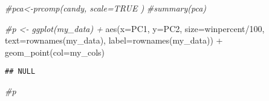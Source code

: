 \documentclass[
]{article}
\newenvironment{Shaded}{\begin{snugshade}}{\end{snugshade}}
\newcommand{\AttributeTok}[1]{\textcolor[rgb]{0.77,0.63,0.00}{#1}}
\newcommand{\CommentTok}[1]{\textcolor[rgb]{0.56,0.35,0.01}{\textit{#1}}}
\newcommand{\DecValTok}[1]{\textcolor[rgb]{0.00,0.00,0.81}{#1}}
\newcommand{\FunctionTok}[1]{\textcolor[rgb]{0.00,0.00,0.00}{#1}}
\newcommand{\NormalTok}[1]{#1}
\newcommand{\SpecialCharTok}[1]{\textcolor[rgb]{0.00,0.00,0.00}{#1}}
\begin{document}
\begin{Shaded}
\begin{Highlighting}[]
\CommentTok{\#pca\textless{}{-}prcomp(candy, scale=TRUE )}
\CommentTok{\#summary(pca)}
\end{Highlighting}
\end{Shaded}

\begin{Shaded}
\end{Shaded}

\begin{Shaded}
\end{Shaded}

\begin{Shaded}
\end{Shaded}

\begin{Shaded}
\begin{Highlighting}[]
\CommentTok{\#p \textless{}{-} ggplot(my\_data) + }
        \FunctionTok{aes}\NormalTok{(}\AttributeTok{x=}\NormalTok{PC1, }\AttributeTok{y=}\NormalTok{PC2, }
            \AttributeTok{size=}\NormalTok{winpercent}\SpecialCharTok{/}\DecValTok{100}\NormalTok{,  }
            \AttributeTok{text=}\FunctionTok{rownames}\NormalTok{(my\_data),}
            \AttributeTok{label=}\FunctionTok{rownames}\NormalTok{(my\_data)) }\SpecialCharTok{+}
        \FunctionTok{geom\_point}\NormalTok{(}\AttributeTok{col=}\NormalTok{my\_cols)}
\end{Highlighting}
\end{Shaded}

\begin{verbatim}
## NULL
\end{verbatim}

\begin{Shaded}
\begin{Highlighting}[]
\CommentTok{\#p}
\end{Highlighting}
\end{Shaded}
\end{document}
